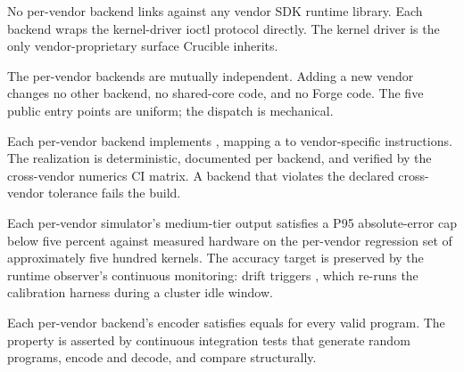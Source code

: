\begin{property}
\label{prop:mimic-no-sdk}
No per-vendor backend links against any vendor SDK runtime library.
Each backend wraps the kernel-driver ioctl protocol directly.
The kernel driver is the only vendor-proprietary surface Crucible inherits.
\end{property}

\begin{property}
\label{prop:mimic-isolation}
The per-vendor backends are mutually independent.
Adding a new vendor changes no other backend, no shared-core code, and no Forge code.
The five public entry points are uniform; the dispatch is mechanical.
\end{property}

\begin{property}
\label{prop:mimic-recipe-fidelity}
Each per-vendor backend implements , mapping a  to vendor-specific instructions.
The realization is deterministic, documented per backend, and verified by the cross-vendor numerics CI matrix.
A backend that violates the declared cross-vendor tolerance fails the build.
\end{property}

\begin{property}
\label{prop:mimic-calibrated}
Each per-vendor simulator's medium-tier output satisfies a P95 absolute-error cap below five percent against measured hardware on the per-vendor regression set of approximately five hundred kernels.
The accuracy target is preserved by the runtime observer's continuous monitoring: drift triggers , which re-runs the calibration harness during a cluster idle window.
\end{property}

\begin{property}
\label{prop:mimic-roundtrip}
Each per-vendor backend's encoder satisfies  equals  for every valid  program.
The property is asserted by continuous integration tests that generate random programs, encode and decode, and compare structurally.
\end{property}
